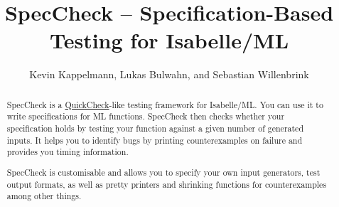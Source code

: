 \documentclass[11pt,a4paper]{article}
\begin{document}
\title{SpecCheck -- Specification-Based Testing for Isabelle/ML}
\author{Kevin Kappelmann, Lukas Bulwahn, and Sebastian Willenbrink}
\maketitle

\begin{abstract}
SpecCheck is a \href{https://en.wikipedia.org/wiki/QuickCheck}{QuickCheck}-like testing framework
for Isabelle/ML.
You can use it to write specifications for ML functions.
SpecCheck then checks whether your specification holds by testing your function against a given number of generated inputs.
It helps you to identify bugs by printing counterexamples on failure and provides you timing information.

SpecCheck is customisable and allows you to specify your own input generators,
test output formats, as well as pretty printers and shrinking functions for counterexamples
among other things.
\end{abstract}

\tableofcontents





\end{document}
